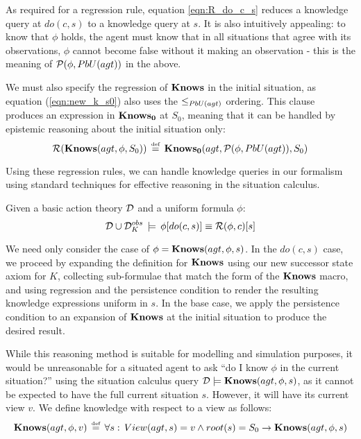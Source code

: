 As required for a regression rule, equation \eqref{eqn:R_do_c_s}
reduces a knowledge query at $do(c,s)$ to a knowledge query at $s$.
It is also intuitively appealing: to know that $\phi$ holds, the
agent must know that in all situations that agree with its observations,
$\phi$ cannot become false without it making an observation - this
is the meaning of $\mathcal{P}(\phi,PbU(agt))$ in the above.

We must also specify the regression of $\mathbf{Knows}$ in the initial situation,
as equation (\ref{eqn:new_k_s0}) also uses the $\leq_{PbU(agt)}$
ordering. This clause produces an expression in $\mathbf{Knows_{0}}$ at $S_{0}$,
meaning that it can be handled by epistemic reasoning about the initial
situation only:\begin{equation}
\mathcal{R}(\mathbf{Knows}(agt,\phi,S_{0}))\,\stackrel{\mbox{\tiny def}}{=}\,\mathbf{Knows_{0}}(agt,\mathcal{P}(\phi,PbU(agt)),S_{0})\label{eqn:R_s0}\end{equation}


Using these regression rules, we can handle knowledge queries in our
formalism using standard techniques for effective reasoning in the
situation calculus.

\begin{thm}
\label{thm:Reg_Knows}Given a basic action theory $\mathcal{D}$ and a uniform
formula $\phi$:\[
\mathcal{D}\cup\mathcal{D}_{K}^{obs}\,\models\,\phi[do(c,s)]\equiv\mathcal{R}(\phi,c)[s]\]
 
\end{thm}
\begin{proofsketch}
We need only consider the case of $\phi=\mathbf{Knows}(agt,\phi,s)$. In the
$do(c,s)$ case, we proceed by expanding the definition for $\mathbf{Knows}$
using our new successor state axiom for $K$, collecting sub-formulae
that match the form of the $\mathbf{Knows}$ macro, and using regression and
the persistence condition to render the resulting knowledge expressions
uniform in $s$. In the base case, we apply the persistence condition
to an expansion of $\mathbf{Knows}$ at the initial situation to produce the
desired result.
\end{proofsketch}


While this reasoning method is suitable for modelling and simulation
purposes, it would be unreasonable for a situated agent to ask {}``do
I know $\phi$ in the current situation?'' using the situation calculus
query $\mathcal{D}\models\mathbf{Knows}(agt,\phi,s)$, as it cannot be expected
to have the full current situation $s$. However, it will have its
current view $v$. We define knowledge with respect to a view as follows:\[
\mathbf{Knows}(agt,\phi,v)\,\stackrel{\mbox{\tiny def}}{=}\,\forall s:\, View(agt,s)=v\wedge root(s)=S_{0}\rightarrow\mathbf{Knows}(agt,\phi,s)\]


